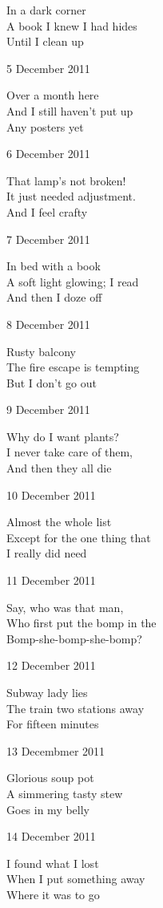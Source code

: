 \documentclass[12pt]{article}
\begin{document}
In a dark corner \\
A book I knew I had hides \\
Until I clean up

5 December 2011

Over a month here \\
And I still haven't put up \\
Any posters yet

6 December 2011

That lamp's not broken! \\
It just needed adjustment. \\
And I feel crafty

7 December 2011

In bed with a book \\
A soft light glowing; I read \\
And then I doze off

8 December 2011

Rusty balcony \\
The fire escape is tempting \\
But I don't go out

9 December 2011

Why do I want plants? \\
I never take care of them, \\
And then they all die

10 December 2011

Almost the whole list \\
Except for the one thing that \\
I really did need

\newpage

11 December 2011

Say, who was that man, \\
Who first put the bomp in the \\
Bomp-she-bomp-she-bomp?

12 December 2011

Subway lady lies \\
The train two stations away \\
For fifteen minutes

13 Decembmer 2011

Glorious soup pot \\
A simmering tasty stew \\
Goes in my belly

14 December 2011

I found what I lost \\
When I put something away \\
Where it was to go
\end{document}
